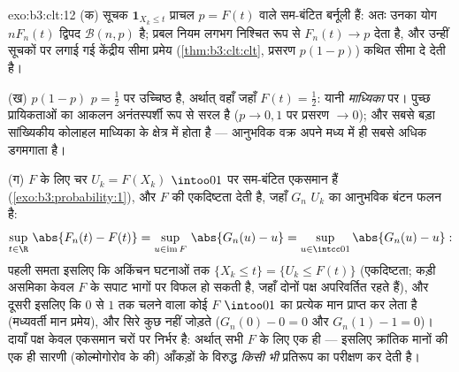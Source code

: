 \begin{solution}{exo:b3:clt:12}
(क) सूचक $\mathbf 1_{X_k \leq t}$ प्राचल $p = F(t)$ वाले
 सम-बंटित बर्नूली हैं: अतः उनका योग $nF_n(t)$ द्विपद
$\mathcal B(n, p)$ है; प्रबल नियम लगभग निश्चित रूप से
$F_n(t) \to p$ देता है, और उन्हीं सूचकों पर लगाई गई केंद्रीय
सीमा प्रमेय (\cref{thm:b3:clt:clt}, प्रसरण $p(1-p)$) कथित
 सीमा दे देती है।

(ख) $p(1 - p)$ $p = \frac12$ पर उच्चिष्ठ है, अर्थात् वहाँ
जहाँ $F(t) = \frac12$: यानी \emph{माध्यिका} पर। पुच्छ
प्रायिकताओं का आकलन अनंतस्पर्शी रूप से सरल है ($p \to 0, 1$
पर प्रसरण $\to 0$); और सबसे बड़ा सांख्यिकीय कोलाहल माध्यिका
के क्षेत्र में होता है --- आनुभविक वक्र अपने मध्य में ही
सबसे अधिक डगमगाता है।

(ग)  $F$ के लिए चर $U_k = F(X_k)$ $\intoo01$ पर
 सम-बंटित एकसमान हैं (\cref{exo:b3:probability:1}),
और $F$ की एकदिष्टता देती है, जहाँ $G_n$ $U_k$ का आनुभविक
बंटन फलन है:
\[
\sup_{t\in\R}\,\abs{F_n(t) - F(t)}
= \sup_{u \in \operatorname{im}F}\,\abs{G_n(u) - u}
= \sup_{u\in\intcc01}\abs{G_n(u) - u} :
\]
पहली समता इसलिए कि अकिंचन घटनाओं तक $\{X_k \leq t\} = \{U_k
\leq F(t)\}$ (एकदिष्टता; कड़ी असमिका केवल $F$ के सपाट भागों
पर विफल हो सकती है, जहाँ दोनों पक्ष अपरिवर्तित रहते हैं), और
दूसरी इसलिए कि $0$ से $1$ तक चलने वाला कोई  $F$
$\intoo01$ का प्रत्येक मान प्राप्त कर लेता है (मध्यवर्ती मान
प्रमेय), और सिरे कुछ नहीं जोड़ते ($G_n(0) - 0 = 0$ और
$G_n(1) - 1 = 0$)। दायाँ पक्ष केवल एकसमान चरों पर निर्भर है:
अर्थात् सभी $F$ के लिए एक ही  --- इसलिए क्रांतिक
मानों की एक ही सारणी (कोल्मोगोरोव के  की) आँकड़ों
के विरुद्ध \emph{किसी भी}  प्रतिरूप का परीक्षण कर देती
है।
\end{solution}

